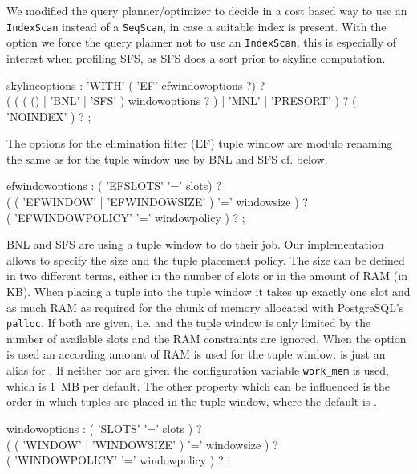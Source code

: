 We modified the query planner/optimizer to decide in a cost based way to use
an \texttt{IndexScan} instead of a \texttt{SeqScan}, in case a suitable
index is present.  With the  option we force the
query planner not to use an \texttt{IndexScan}, this is especially of
interest when profiling SFS, as SFS does a sort prior to skyline
computation.

\begin{rail}
skylineoptions : 
    'WITH' 
    ( 'EF' efwindowoptions ?) ? \\
    ( ( ( () | 'BNL' | 'SFS' ) windowoptions ? ) | 'MNL' | 'PRESORT' ) ? 
    ( 'NOINDEX' ) ? ;
\end{rail}

The options for the elimination filter (EF) tuple window
 are modulo renaming the same as for the tuple window
use by BNL and SFS cf.  below.

\begin{rail}
efwindowoptions : 
    ( 'EFSLOTS' '=' slots) ? \\
    ( ( 'EFWINDOW' | 'EFWINDOWSIZE' ) '=' windowsize ) ? \\
    ( 'EFWINDOWPOLICY' '=' windowpolicy ) ? ;
\end{rail}

BNL and SFS are using a tuple window to do their job. Our
implementation allows to specify the size and the tuple placement
policy. The size can be defined in two different terms, either
in the number of slots or in the amount of RAM (in KB). When placing
a tuple into the tuple window it takes up exactly one slot and
as much RAM as required for the chunk of memory allocated with PostgreSQL's
\texttt{palloc}. If both are given, i.e.  and 
the tuple window is only limited by the number of available slots and
the RAM constraints are ignored. When the 
option is used an according amount of RAM is used for the tuple window.
 is just an alias for .  If
neither  nor  are given the
configuration variable \texttt{work\_mem} is used, which is 1~MB per
default. The other property which can be influenced is the order in which
tuples are placed in the tuple window, where the default is .

\begin{rail}
windowoptions : 
    ( 'SLOTS' '=' slots ) ? \\
    ( ( 'WINDOW' | 'WINDOWSIZE' ) '=' windowsize ) ? \\ 
    ( 'WINDOWPOLICY' '=' windowpolicy ) ? ;
\end{rail}

